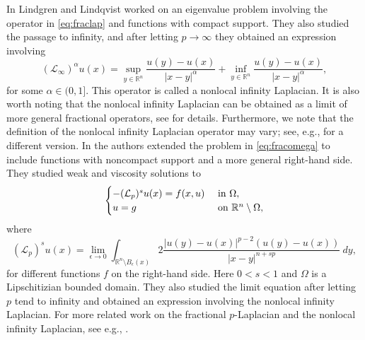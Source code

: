 \documentclass[11pt]{article}
\providecommand{\Rn}{\mathbb{R}^n}
\numberwithin{equation}{section}
\theoremstyle{definition}
\begin{document}
In \cite{LL2012} Lindgren and Lindqvist worked on an eigenvalue problem involving the operator in \eqref{eq:fraclap} and functions with compact support. They also studied the passage to infinity, and after letting $p \to \infty$ they obtained an expression involving
\begin{equation} \label{eq:infinitylap}
(\mathcal{L}_{\infty})^{\alpha}u(x) = \sup_{y \in \Rn} \frac{u(y)-u(x)}{|x-y|^{\alpha}} + \inf_{y \in \Rn} \frac{u(y)-u(x)}{|x-y|^{\alpha}},
\end{equation}
for some $\alpha \in (0,1]$. This operator is called a nonlocal infinity Laplacian. It is also worth noting that the nonlocal infinity Laplacian can be obtained as a limit of more general
fractional operators, see \cite{BPLS2022} for details. Furthermore, we note that the definition of the nonlocal infinity Laplacian operator may vary; see, e.g., \cite{BCF2012} for a different version.
In \cite{FL2016} the authors extended the problem in \eqref{eq:fracomega} to include functions with noncompact support and a more general right-hand side. They studied weak and viscosity solutions to
\begin{align*} 
     \begin{cases}
                    - (\mathcal{L}_p)^{s} u(x) = f(x,u) & \textup{ in } \Omega, \\
                    u =g & \textup{ on } \Rn \setminus \Omega, 
     \end{cases}
\end{align*}
where
$$
(\mathcal{L}_p)^{s} u(x) = \lim_{\epsilon \to 0} \int_{\Rn \setminus B_{\epsilon}(x)} 2\frac{|u(y)-u(x)|^{p-2}(u(y)-u(x))}{|x-y|^{n+s p}} \ dy,
$$
 for different functions $f$ on the right-hand side. Here $0<s<1$ and $\Omega$ is a Lipschitizian bounded domain. They also studied the limit equation after letting $p$ tend to infinity and obtained an expression involving the nonlocal infinity Laplacian. For more related work on the fractional $p$-Laplacian and the nonlocal infinity Laplacian, see e.g., \cite{ CRY2010, CS2007,SR2019}.  
\end{document}
